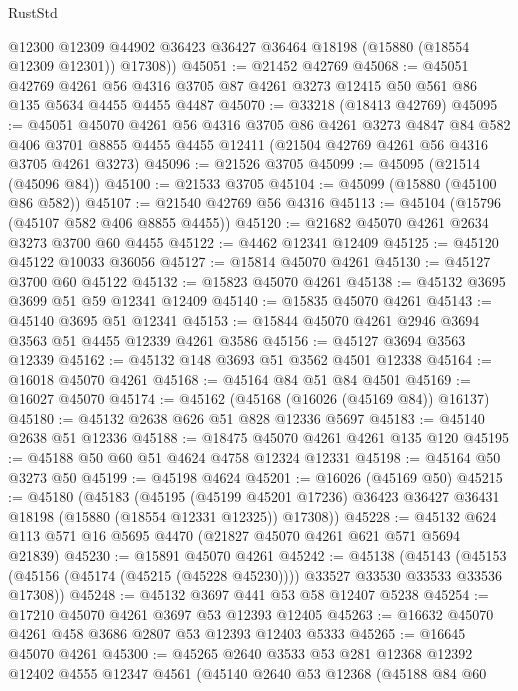 \begin{lexlean}{RustStd}
\begin{coremodule}
        @12300
        @12309
        @44902
        @36423
        @36427
        @36464
        @18198
        (@15880 (@18554 @12309 @12301))
        @17308))
@45051 := @21452 @42769
@45068 := @45051
    @42769
    @4261
    @56
    @4316
    @3705
    @87
    @4261
    @3273
    @12415
    @50
    @561
    @86
    @135
    @5634
    @4455
    @4455
    @4487
@45070 := @33218 (@18413 @42769)
@45095 := @45051
    @45070
    @4261
    @56
    @4316
    @3705
    @86
    @4261
    @3273
    @4847
    @84
    @582
    @406
    @3701
    @8855
    @4455
    @4455
    @12411
    (@21504 @42769 @4261 @56 @4316 @3705 @4261 @3273)
@45096 := @21526 @3705
@45099 := @45095 (@21514 (@45096 @84))
@45100 := @21533 @3705
@45104 := @45099 (@15880 (@45100 @86 @582))
@45107 := @21540 @42769 @56 @4316
@45113 := @45104 (@15796 (@45107 @582 @406 @8855 @4455))
@45120 := @21682 @45070 @4261 @2634 @3273 @3700 @60 @4455
@45122 := @4462 @12341 @12409
@45125 := @45120 @45122 @10033 @36056
@45127 := @15814 @45070 @4261
@45130 := @45127 @3700 @60 @45122
@45132 := @15823 @45070 @4261
@45138 := @45132 @3695 @3699 @51 @59 @12341 @12409
@45140 := @15835 @45070 @4261
@45143 := @45140 @3695 @51 @12341
@45153 := @15844 @45070 @4261 @2946 @3694 @3563 @51 @4455 @12339 @4261 @3586
@45156 := @45127 @3694 @3563 @12339
@45162 := @45132 @148 @3693 @51 @3562 @4501 @12338
@45164 := @16018 @45070 @4261
@45168 := @45164 @84 @51 @84 @4501
@45169 := @16027 @45070
@45174 := @45162 (@45168 (@16026 (@45169 @84)) @16137)
@45180 := @45132 @2638 @626 @51 @828 @12336 @5697
@45183 := @45140 @2638 @51 @12336
@45188 := @18475 @45070 @4261 @4261 @135 @120
@45195 := @45188 @50 @60 @51 @4624 @4758 @12324 @12331
@45198 := @45164 @50 @3273 @50
@45199 := @45198 @4624
@45201 := @16026 (@45169 @50)
@45215 := @45180
    (@45183
      (@45195
        (@45199 @45201 @17236)
        @36423
        @36427
        @36431
        @18198
        (@15880 (@18554 @12331 @12325))
        @17308))
@45228 := @45132 @624 @113 @571 @16 @5695 @4470 (@21827 @45070 @4261 @621 @571 @5694 @21839)
@45230 := @15891 @45070 @4261
@45242 := @45138
    (@45143 (@45153 (@45156 (@45174 (@45215 (@45228 @45230)))) @33527 @33530 @33533 @33536 @17308))
@45248 := @45132 @3697 @441 @53 @58 @12407 @5238
@45254 := @17210 @45070 @4261 @3697 @53 @12393 @12405
@45263 := @16632 @45070 @4261 @458 @3686 @2807 @53 @12393 @12403 @5333
@45265 := @16645 @45070 @4261
@45300 := @45265
    @2640
    @3533
    @53
    @281
    @12368
    @12392
    @12402
    @4555
    @12347
    @4561
    (@45140
      @2640
      @53
      @12368
      (@45188
        @84
        @60

\end{coremodule}
\end{lexlean}
